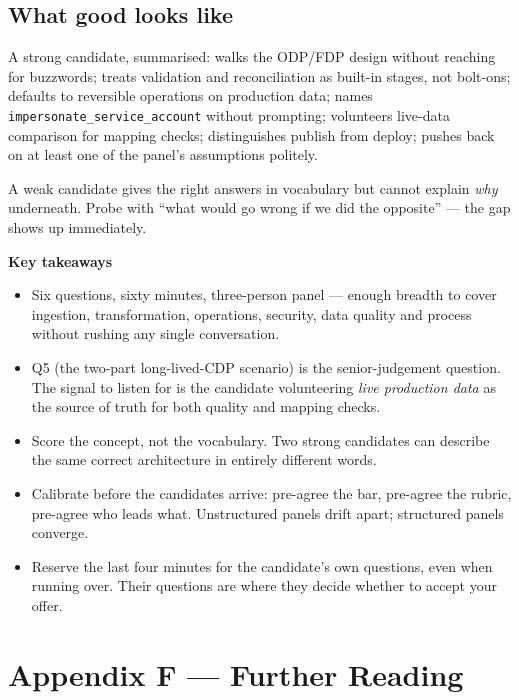 \documentclass[
  11pt,
  british,
  oneside]{book}
\begin{document}
\hypertarget{what-good-looks-like}{%
\section{What good looks like}\label{what-good-looks-like}}

A strong candidate, summarised: walks the ODP/FDP design without
reaching for buzzwords; treats validation and reconciliation as built-in
stages, not bolt-ons; defaults to reversible operations on production
data; names \texttt{impersonate\_service\_account} without prompting;
volunteers live-data comparison for mapping checks; distinguishes
publish from deploy; pushes back on at least one of the panel's
assumptions politely.

A weak candidate gives the right answers in vocabulary but cannot
explain \emph{why} underneath. Probe with ``what would go wrong if we
did the opposite'' --- the gap shows up immediately.

\begin{takeaways}
\textbf{Key takeaways}
\begin{itemize}
  \item Six questions, sixty minutes, three-person panel — enough breadth to cover ingestion, transformation, operations, security, data quality and process without rushing any single conversation.
  \item Q5 (the two-part long-lived-CDP scenario) is the senior-judgement question. The signal to listen for is the candidate volunteering \emph{live production data} as the source of truth for both quality and mapping checks.
  \item Score the concept, not the vocabulary. Two strong candidates can describe the same correct architecture in entirely different words.
  \item Calibrate before the candidates arrive: pre-agree the bar, pre-agree the rubric, pre-agree who leads what. Unstructured panels drift apart; structured panels converge.
  \item Reserve the last four minutes for the candidate's own questions, even when running over. Their questions are where they decide whether to accept your offer.
\end{itemize}
\end{takeaways}

\newpage

\hypertarget{appendix-f-further-reading}{%
\chapter{Appendix F --- Further
Reading}\label{appendix-f-further-reading}}
\end{document}
